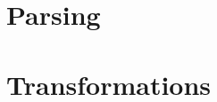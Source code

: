\documentclass[a4paper,draft]{article}
\begin{document}
\section{Parsing}

\section{Transformations}



\end{document}

